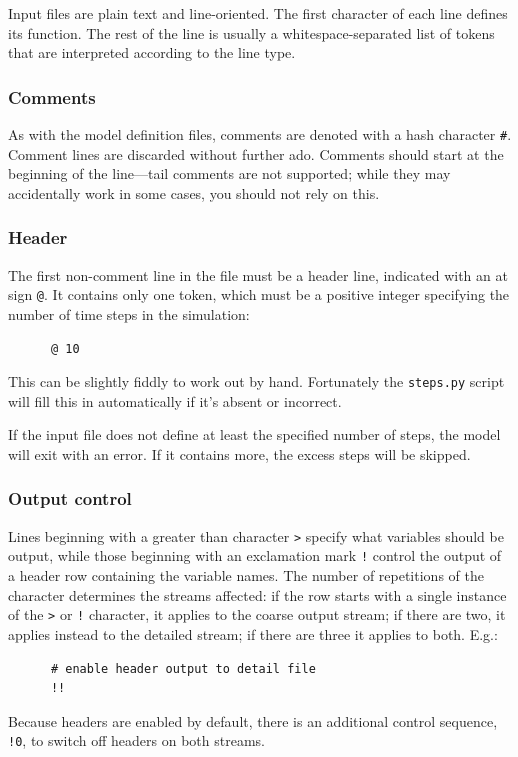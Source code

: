 \documentclass[a4paper,11pt]{article}
\begin{document}
Input files are plain text and line-oriented. The first character of each line defines its function. The rest of the line is usually  a whitespace-separated list of tokens that are interpreted according to the line type.

\subsubsection{Comments}
As with the model definition files, comments are denoted with a hash character \texttt{\#}. Comment lines are discarded without further ado. Comments should start at the beginning of the line---tail comments are not supported; while they may accidentally work in some cases, you should not rely on this.

\subsubsection{Header}
The first non-comment line in the file must be a header line, indicated with an at sign \texttt{@}. It contains only one token, which must be a positive integer specifying the number of time steps in the simulation:
\begin{verbatim}
      @ 10
\end{verbatim}
This can be slightly fiddly to work out by hand. Fortunately the \texttt{steps.py} script will fill this in automatically if it's absent or incorrect.

If the input file does not define at least the specified number of steps, the model will exit with an error. If it contains more, the excess steps will be skipped.

\subsubsection{Output control}
Lines beginning with a greater than character \texttt{>} specify what variables should be output, while those beginning with an exclamation mark \texttt{!} control the output of a header row containing the variable names. The number of repetitions of the character determines the streams affected: if the row starts with a single instance of the \texttt{>} or \texttt{!} character, it applies to the coarse output stream; if there are two, it applies instead to the detailed stream; if there are three it applies to both. E.g.:
\begin{verbatim}
      # enable header output to detail file
      !!
\end{verbatim}
Because headers are enabled by default, there is an additional control sequence, \texttt{!0}, to switch off headers on both streams.
\end{document}
